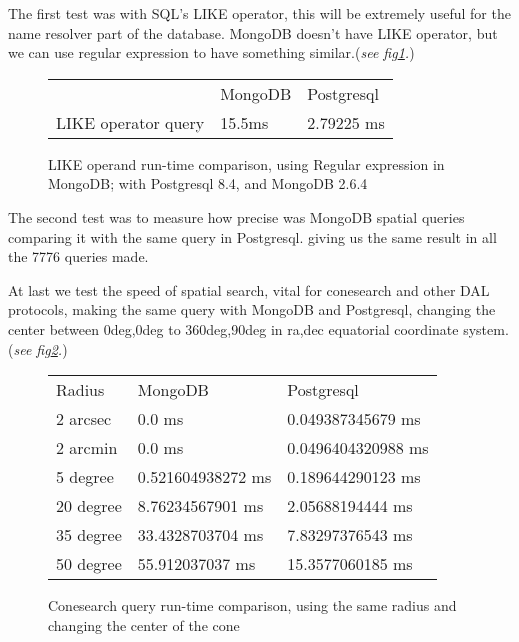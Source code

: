 \documentclass[11pt,twoside]{article}
\begin{document}
    The first test was with SQL’s LIKE operator, this will be extremely useful for the name resolver part of the database. MongoDB doesn’t have LIKE operator, but we can use regular expression to have something similar.(\emph{see fig\ref{fig:like}.})
\begin{figure}
    \centering
    \begin{tabular}{lll}    
                        & MongoDB & Postgresql \\
    LIKE operator query & 15.5ms  & 2.79225 ms
    \end{tabular}
    \caption{LIKE operand run-time comparison, using Regular expression in MongoDB; with Postgresql 8.4, and MongoDB 2.6.4}
    \label{fig:like}
\end{figure}

    The second test was to measure how precise was MongoDB spatial queries comparing it with the same query in Postgresql. giving us the same result in all the 7776 queries made.
                
    At last we test the speed of spatial search, vital for conesearch and other DAL protocols, making the same query with MongoDB and Postgresql, changing the center between 0deg,0deg to 360deg,90deg in ra,dec equatorial coordinate system. (\emph{see fig\ref{fig:cone}.})
\begin{figure}
\centering

\begin{tabular}{lll}
 Radius &MongoDB &Postgresql\\
2 arcsec&0.0 ms &0.049387345679 ms\\
2 arcmin&0.0 ms &0.0496404320988 ms\\
5 degree&0.521604938272 ms&0.189644290123 ms\\ 
20 degree &8.76234567901 ms&2.05688194444 ms\\
35 degree &33.4328703704 ms& 7.83297376543 ms\\
50 degree & 55.912037037 ms&15.3577060185 ms
\end{tabular}


\caption{Conesearch query run-time comparison, using the same radius and changing the center of the cone}
\label{fig:cone}
\end{figure}    
\end{document}
